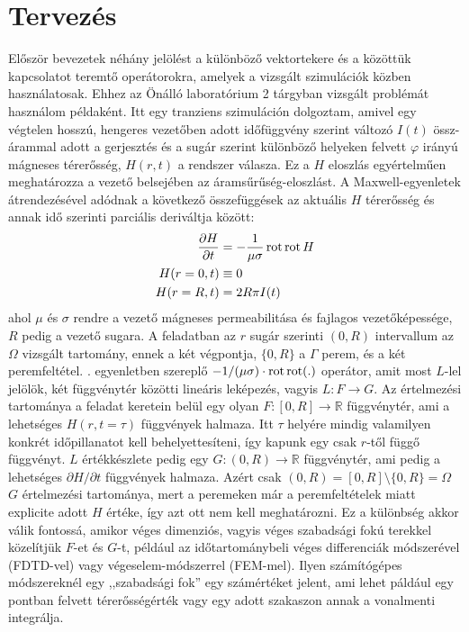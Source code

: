 \chapter{Tervezés}
Először bevezetek néhány jelölést a különböző vektortekere és a közöttük kapcsolatot teremtő operátorokra, amelyek a vizsgált szimulációk közben használatosak. Ehhez az Önálló laboratórium 2 tárgyban vizsgált problémát használom példaként. Itt egy tranziens szimuláción dolgoztam, amivel egy végtelen hosszú, hengeres vezetőben adott időfüggvény szerint változó $I(t)$ össz-árammal adott a gerjesztés és a sugár szerint különböző helyeken felvett $\varphi$ irányú mágneses térerősség, $H(r,t)$ a rendszer válasza. Ez a $H$ eloszlás egyértelműen meghatározza a vezető belsejében az áramsűrűség-eloszlást. A Maxwell-egyenletek átrendezésével adódnak a következő összefüggések az aktuális $H$ térerősség és annak idő szerinti parciális deriváltja között:
\begin{align}
\label{equ:rotrotH}
	\dfrac{\partial H}{\partial t} &= -\dfrac{1}{\mu\sigma}\operatorname{rot}\operatorname{rot} H\\
\label{equ:r=0perem}
	H(r=0,t) &\equiv 0\\
\label{equ:r=Rperem}
	H(r=R,t) &= 2R\pi I(t)
\end{align}
ahol $\mu$ és $\sigma$ rendre a vezető mágneses permeabilitása és fajlagos vezetőképessége, $R$ pedig a vezető sugara. A feladatban az $r$ sugár szerinti $(0,R)$ intervallum az $\Omega$ vizsgált tartomány, ennek a két végpontja, $\{0,R\}$ a $\Gamma$ perem,  és  a két peremfeltétel. . egyenletben szereplő $-1/(\mu\sigma)\cdot\operatorname{rot}\operatorname{rot}(.)$ operátor, amit most $L$-lel jelölök, két függvénytér közötti lineáris leképezés, vagyis $L: F \rightarrow G$. Az értelmezési tartománya a feladat keretein belül egy olyan $F: [0,R] \rightarrow \mathbb{R}$ függvénytér, ami a lehetséges $H(r,t=\tau)$ függvények halmaza. Itt $\tau$ helyére mindig valamilyen konkrét időpillanatot kell behelyettesíteni, így kapunk egy csak $r$-től függő függvényt. $L$ értékkészlete pedig egy $G: (0,R) \rightarrow \mathbb{R}$ függvénytér, ami pedig a lehetséges $\partial H/\partial t$ függvények halmaza. Azért csak $(0,R) = [0,R]\setminus\{0,R\} = \Omega$ $G$ értelmezési tartománya, mert a peremeken már a peremfeltételek miatt explicite adott $H$ értéke, így azt ott nem kell meghatározni. Ez a különbség akkor válik fontossá, amikor véges dimenziós, vagyis véges szabadsági fokú terekkel közelítjük $F$-et és $G$-t, például az időtartománybeli véges differenciák módszerével (FDTD-vel) vagy végeselem-módszerrel (FEM-mel). Ilyen számítógépes módszereknél egy ,,szabadsági fok'' egy számértéket jelent, ami lehet páldául egy pontban felvett térerősségérték vagy egy adott szakaszon annak a vonalmenti integrálja.

